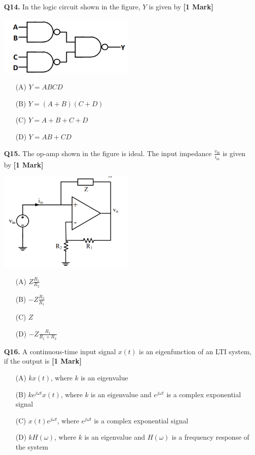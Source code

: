 \documentclass[11pt]{article}
\newcommand{\questiona}[2]{
    \noindent\textbf{Q#2.} #1 \hfill \textbf{[1 Mark]}
}
\begin{document}
\questiona{In the logic circuit shown in the figure, \( Y \) is given by}{14}
\begin{center}
\includegraphics[width=0.5\textwidth]{figures/14.png}
\end{center}
\begin{enumerate}
    \item[(A)] \( Y = ABCD \)
    \item[(B)] \( Y = (A + B)(C + D) \)
    \item[(C)] \( Y = A + B + C + D \)
    \item[(D)] \( Y = AB + CD \)
\end{enumerate}
\vspace{0.5cm}

\questiona{The op-amp shown in the figure is ideal. The input impedance \( \frac{v_{\text{in}}}{i_{\text{in}}} \) is given by}{15}
\begin{center}
\includegraphics[width=0.5\textwidth]{figures/15.png}
\end{center}
\begin{enumerate}
    \item[(A)] \( Z \frac{R_1}{R_2} \)
    \item[(B)] \( -Z \frac{R_2}{R_1} \)
    \item[(C)] \( Z \)
    \item[(D)] \( -Z \frac{R_1}{R_1 + R_2} \)
\end{enumerate}
\vspace{0.5cm}

\questiona{A continuous-time input signal \( x(t) \) is an eigenfunction of an LTI system, if the output is}{16}
\begin{enumerate}
    \item[(A)] \( k x(t) \), where \( k \) is an eigenvalue
    \item[(B)] \( k e^{j\omega t} x(t) \), where \( k \) is an eigenvalue and \( e^{j\omega t} \) is a complex exponential signal
    \item[(C)] \( x(t) e^{j\omega t} \), where \( e^{j\omega t} \) is a complex exponential signal
    \item[(D)] \( k H(\omega) \), where \( k \) is an eigenvalue and \( H(\omega) \) is a frequency response of the system
\end{enumerate}
\vspace{0.5cm}
\end{document}
